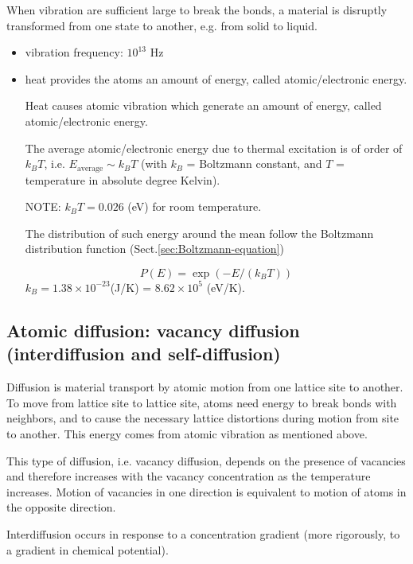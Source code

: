 When vibration are sufficient large to break the bonds, a material is
disruptly transformed from one state to another, e.g. from solid to liquid.

\begin{itemize}
  \item vibration frequency: $10^{13}$ Hz
  
  \item heat provides the atoms an amount of energy, called
  atomic/electronic energy.
  
  Heat causes atomic vibration which generate an amount of energy, called
  atomic/electronic energy.
  
  The average atomic/electronic energy due to thermal excitation is of order of
  $k_B T$, i.e. $E_\text{average} \sim k_BT$ (with $k_B$ = Boltzmann constant,
  and $T$ = temperature in absolute degree Kelvin).

NOTE: $k_BT = 0.026$ (eV) for room temperature.
  
The distribution of such energy around the mean follow the Boltzmann
distribution function (Sect.\ref{sec:Boltzmann-equation})

\begin{equation}
P(E) = \exp\left( -E/(k_BT)\right)
 \end{equation}
$k_B = 1.38 \times 10^{-23}	$(J/K) = $8.62\times 10^5 $ (eV/K).  
  
  
\end{itemize}


\subsection{Atomic diffusion: vacancy diffusion (interdiffusion and
self-diffusion)}

Diffusion is material transport by atomic motion from one lattice site to
another. To move from lattice site to lattice site, atoms need energy to break
bonds with neighbors, and to cause the necessary lattice distortions during
motion from site to another. This energy comes from atomic vibration as
mentioned above.

This type of diffusion, i.e. vacancy diffusion, depends on the presence of
vacancies and therefore increases with the vacancy concentration as the
temperature increases.  Motion of vacancies in one direction is equivalent to
motion of atoms in the opposite direction.

Interdiffusion occurs in response to a concentration gradient (more rigorously,
to a gradient in chemical potential).

